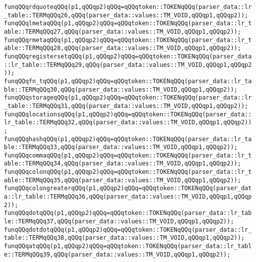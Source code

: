 \verb|funqQQqrdquoteqQQq(p1,qQQqp2)qQQq=qQQqtoken::TOKENqQQq(parser_data::lr_table::TERMqQQq26,qQQq(parser_data::values::TM_VOID,qQQqp1,qQQqp2));|\newline
\verb|funqQQqlmetaqQQq(p1,qQQqp2)qQQq=qQQqtoken::TOKENqQQq(parser_data::lr_table::TERMqQQq27,qQQq(parser_data::values::TM_VOID,qQQqp1,qQQqp2));|\newline
\verb|funqQQqrmetaqQQq(p1,qQQqp2)qQQq=qQQqtoken::TOKENqQQq(parser_data::lr_table::TERMqQQq28,qQQq(parser_data::values::TM_VOID,qQQqp1,qQQqp2));|\newline
\verb|funqQQqregistersetqQQq(p1,qQQqp2)qQQq=qQQqtoken::TOKENqQQq(parser_data::lr_table::TERMqQQq29,qQQq(parser_data::values::TM_VOID,qQQqp1,qQQqp2));|\newline
\verb|funqQQqfn_tqQQq(p1,qQQqp2)qQQq=qQQqtoken::TOKENqQQq(parser_data::lr_table::TERMqQQq30,qQQq(parser_data::values::TM_VOID,qQQqp1,qQQqp2));|\newline
\verb|funqQQqstorageqQQq(p1,qQQqp2)qQQq=qQQqtoken::TOKENqQQq(parser_data::lr_table::TERMqQQq31,qQQq(parser_data::values::TM_VOID,qQQqp1,qQQqp2));|\newline
\verb|funqQQqlocationsqQQq(p1,qQQqp2)qQQq=qQQqtoken::TOKENqQQq(parser_data::lr_table::TERMqQQq32,qQQq(parser_data::values::TM_VOID,qQQqp1,qQQqp2));|\newline
\verb|funqQQqhashqQQq(p1,qQQqp2)qQQq=qQQqtoken::TOKENqQQq(parser_data::lr_table::TERMqQQq33,qQQq(parser_data::values::TM_VOID,qQQqp1,qQQqp2));|\newline
\verb|funqQQqcommaqQQq(p1,qQQqp2)qQQq=qQQqtoken::TOKENqQQq(parser_data::lr_table::TERMqQQq34,qQQq(parser_data::values::TM_VOID,qQQqp1,qQQqp2));|\newline
\verb|funqQQqcolonqQQq(p1,qQQqp2)qQQq=qQQqtoken::TOKENqQQq(parser_data::lr_table::TERMqQQq35,qQQq(parser_data::values::TM_VOID,qQQqp1,qQQqp2));|\newline
\verb|funqQQqcolongreaterqQQq(p1,qQQqp2)qQQq=qQQqtoken::TOKENqQQq(parser_data::lr_table::TERMqQQq36,qQQq(parser_data::values::TM_VOID,qQQqp1,qQQqp2));|\newline
\verb|funqQQqdotqQQq(p1,qQQqp2)qQQq=qQQqtoken::TOKENqQQq(parser_data::lr_table::TERMqQQq37,qQQq(parser_data::values::TM_VOID,qQQqp1,qQQqp2));|\newline
\verb|funqQQqdotdotqQQq(p1,qQQqp2)qQQq=qQQqtoken::TOKENqQQq(parser_data::lr_table::TERMqQQq38,qQQq(parser_data::values::TM_VOID,qQQqp1,qQQqp2));|\newline
\verb|funqQQqatqQQq(p1,qQQqp2)qQQq=qQQqtoken::TOKENqQQq(parser_data::lr_table::TERMqQQq39,qQQq(parser_data::values::TM_VOID,qQQqp1,qQQqp2));|\newline
